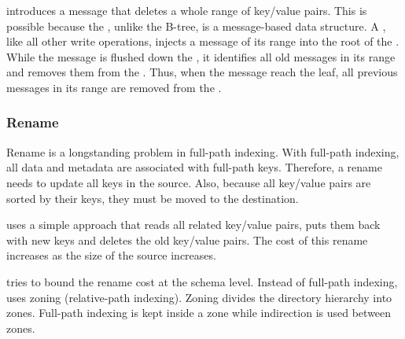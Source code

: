 \betrfsTwo introduces a \rd message that deletes a whole range of key/value
pairs.
This is possible because the \bet, unlike the B-tree, is a message-based
data structure.
A \rd, like all other write operations, injects a \rd message of its range into
the root of the \bet.
While the \rd message is flushed down the \bet, it identifies all old messages
in its range and removes them from the \bet.
Thus, when the \rd message reach the leaf, all previous messages in its range
are removed from the \bet.

\subsubsection{Rename}

Rename is a longstanding problem in full-path indexing.
With full-path indexing, all data and metadata are associated with full-path
keys.
Therefore, a rename needs to update all keys in the source.
Also, because all key/value pairs are sorted by their keys, they must be moved
to the destination.

\betrfsOne uses a simple approach that reads all related key/value pairs, puts
them back with new keys and deletes the old key/value pairs.
The cost of this rename increases as the size of the source increases.

\betrfsTwo tries to bound the rename cost at the schema level.
Instead of full-path indexing, \betrfsTwo uses zoning (relative-path indexing).
Zoning divides the directory hierarchy into zones.
Full-path indexing is kept inside a zone while indirection is used between
zones.

